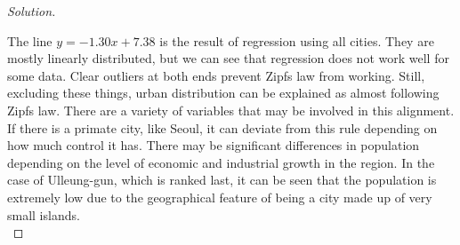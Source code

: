 \begin{proof} [Solution]
\begin{center}
		\end{center}
		The line $y = -1.30x + 7.38$ is the result of regression using all cities. They are mostly linearly distributed, but we can see that regression does not work well for some data. Clear outliers at both ends prevent Zipf\textquotesingle s law from working. Still, excluding these things, urban distribution can be explained as almost following Zipf\textquotesingle s law. There are a variety of variables that may be involved in this alignment. If there is a primate city, like Seoul, it can deviate from this rule depending on how much control it has. There may be significant differences in population depending on the level of economic and industrial growth in the region. In the case of Ulleung-gun, which is ranked last, it can be seen that the population is extremely low due to the geographical feature of being a city made up of very small islands.\\
	\end{proof}